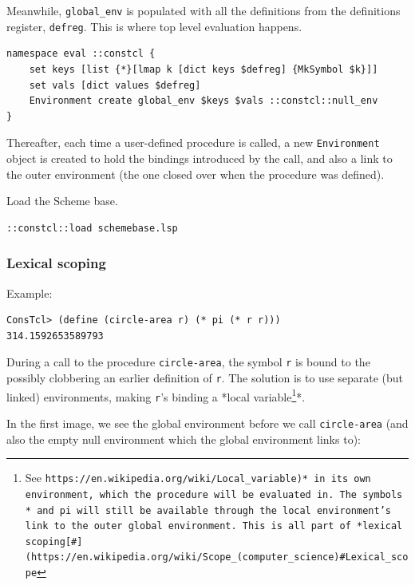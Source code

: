\documentclass[twoside,9pt]{report}
\begin{document}
Meanwhile, \texttt{global\_env} is populated with all the definitions from the definitions register, \texttt{defreg}. This is where top level evaluation happens.

\noindent\makebox[\linewidth]{\rule{\linewidth}{0.4pt}}
\begin{lstlisting}
namespace eval ::constcl {
    set keys [list {*}[lmap k [dict keys $defreg] {MkSymbol $k}]]
    set vals [dict values $defreg]
    Environment create global_env $keys $vals ::constcl::null_env
}
\end{lstlisting}
\noindent\makebox[\linewidth]{\rule{\linewidth}{0.4pt}}

Thereafter, each time a user-defined procedure is called, a new \texttt{Environment} object is created to hold the bindings introduced by the call, and also a link to the outer environment (the one closed over when the procedure was defined).


Load the Scheme base.

\noindent\makebox[\linewidth]{\rule{\linewidth}{0.4pt}}
\begin{lstlisting}
::constcl::load schemebase.lsp
\end{lstlisting}
\noindent\makebox[\linewidth]{\rule{\linewidth}{0.4pt}}
\subsubsection{Lexical scoping}
\label{lexical-scoping}

Example:

\noindent\makebox[\linewidth]{\rule{\linewidth}{0.4pt}}
\begin{lstlisting}
ConsTcl> (define (circle-area r) (* pi (* r r)))
314.1592653589793
\end{lstlisting}
\noindent\makebox[\linewidth]{\rule{\linewidth}{0.4pt}}

During a call to the procedure \texttt{circle-area}, the symbol \texttt{r} is bound to the possibly clobbering an earlier definition of \texttt{r}. The solution is to use separate (but linked) environments, making \texttt{r}'s binding a *local variable\footnote{See \texttt{https://en.wikipedia.org/wiki/Local\_variable)* in its own environment, which the procedure will be evaluated in. The symbols \texttt{*} and \texttt{pi} will still be available through the local environment's link to the outer global environment. This is all part of *lexical scoping[\#](https://en.wikipedia.org/wiki/Scope\_(computer\_science)\#Lexical\_scope}}*.


In the first image, we see the global environment before we call \texttt{circle-area} (and also the empty null environment which the global environment links to):
\end{document}
